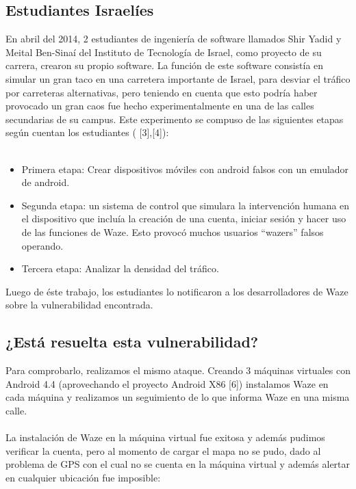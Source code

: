 \subsection{Estudiantes Israelíes}

En abril del 2014, 2 estudiantes de ingeniería de software llamados Shir Yadid y Meital Ben-Sinaí del Instituto de Tecnología de Israel, como proyecto de su carrera, crearon su propio software. La función de este software consistía en simular un gran taco en una carretera importante de Israel, para desviar el tráfico por carreteras alternativas, pero teniendo en cuenta que esto podría haber provocado un gran caos fue hecho experimentalmente en una de las calles secundarias de su campus.
Este experimento se compuso de las siguientes etapas según cuentan los estudiantes ( [3],[4]):
\\\\
\begin{itemize}
\item Primera etapa: Crear dispositivos móviles con android falsos con un emulador de android. 
\item Segunda etapa: un sistema de control que simulara la intervención humana en el dispositivo que incluía la creación de una cuenta, iniciar sesión y hacer uso de las funciones de Waze. Esto provocó muchos usuarios “wazers” falsos operando.
\item Tercera etapa: Analizar la densidad del tráfico.
\end{itemize}

Luego de éste trabajo, los estudiantes lo notificaron a los desarrolladores de Waze sobre la vulnerabilidad encontrada.


\subsection{¿Está resuelta esta vulnerabilidad?}

Para comprobarlo, realizamos el mismo ataque. Creando 3 máquinas virtuales con Android 4.4 (aprovechando el proyecto Android X86 [6]) instalamos Waze en cada máquina y realizamos un seguimiento de lo que informa Waze en una misma calle.
\\\\
La instalación de Waze en la máquina virtual fue exitosa y además pudimos verificar la cuenta, pero al momento de cargar el mapa no se pudo, dado al problema de GPS con el cual no se cuenta en la máquina virtual y además alertar en cualquier ubicación fue imposible:




